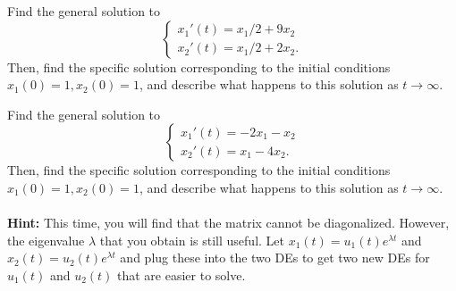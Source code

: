 \documentclass[12pt,letterpaper]{hmcpset}
\begin{document}
\begin{problem}[4]
    Find the general solution to
    \[
        \begin{cases}
            x_1'(t)=x_1/2+9x_2\\
            x_2'(t)=x_1/2+2x_2.
        \end{cases}
    \]
    Then, find the specific solution corresponding to the initial
    conditions $x_1(0)=1,x_2(0)=1$, and describe what happens to
    this solution as $t\to\infty$.
\end{problem}
\begin{solution}
    \vfill
\end{solution}
\newpage

\begin{problem}[5]
    Find the general solution to
    \[
        \begin{cases}
            x_1'(t)=-2x_1-x_2\\
            x_2'(t)=x_1-4x_2.
        \end{cases}
    \]
    Then, find the specific solution corresponding to the initial
    conditions $x_1(0)=1,x_2(0)=1$, and describe what happens to
    this solution as $t\to\infty$.\\\\
    \textbf{Hint:} This time, you will find that the matrix cannot be
    diagonalized. However, the eigenvalue $\lambda$ that you obtain is
    still useful. Let $x_1(t)=u_1(t)e^{\lambda t}$ and
    $x_2(t)=u_2(t)e^{\lambda t}$ and plug these into the two DEs to
    get two new DEs for $u_1(t)$ and $u_2(t)$ that are easier to
    solve.
\end{problem}
\begin{solution}
    \vfill
\end{solution}
\end{document}

